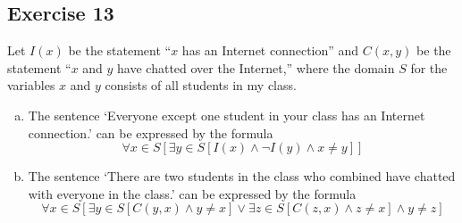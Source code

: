 \documentclass[a4paper]{article}
\newcommand{\exercise}[2]{\subsection*{Exercise #1}{#2}}
\begin{document}
\exercise{13}{%
Let $I (x)$ be the statement ``$x$ has an Internet connection''
and $C(x, y)$ be the statement ``$x$ and $y$ have chatted over
the Internet,'' where the domain $S$ for the variables $x$ and $y$
consists of all students in my class.
\begin{enumerate}[a)]
\addtocounter{enumi}{8}
\item%
The sentence
`Everyone except one student in your class has an Internet connection.'
can be expressed by the formula
\[\forall x \in S[\exists y \in S[I(x) \land \neg I(y) \land x \neq y]]\]

\addtocounter{enumi}{5}
\item%
The sentence
`There are two students in the class who combined
     have chatted with everyone in the class.'
can be expressed by the formula
\[\forall x \in S[\exists y \in S[C(y, x) \land y \neq x] \lor \exists z \in S[C(z, x) \land z \neq x] \land y \neq z]\]

\end{enumerate}
}
\end{document}
